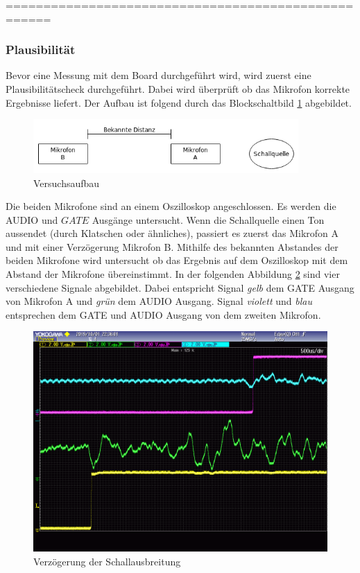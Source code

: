 ====================================================
\subsubsection{Plausibilität}
Bevor eine Messung mit dem Board durchgeführt wird, wird zuerst eine Plausibilitätscheck durchgeführt. Dabei wird überprüft ob das Mikrofon korrekte Ergebnisse liefert. Der Aufbau ist folgend durch das Blockschaltbild \ref{img:blockschaltbild_plausibilitaetscheck} abgebildet. 
\begin{figure}[H]
        \centering
        \includegraphics[width=0.9\textwidth]{images/plausibilitaetscheck.png}
        \caption{Versuchsaufbau}
        \label{img:blockschaltbild_plausibilitaetscheck}
\end{figure}

Die beiden Mikrofone sind an einem Oszilloskop angeschlossen. Es werden die \si{AUDIO} und $GATE$ Ausgänge untersucht. Wenn die Schallquelle einen Ton aussendet (durch Klatschen oder ähnliches), passiert es zuerst das Mikrofon A und mit einer Verzögerung Mikrofon B. Mithilfe des bekannten Abstandes der beiden Mikrofone wird untersucht ob das Ergebnis auf dem Oszilloskop mit dem Abstand der Mikrofone übereinstimmt. In der folgenden Abbildung \ref{img:plausibilitaetscheck_oszi} sind vier verschiedene Signale abgebildet. Dabei entspricht Signal \textit{gelb} dem \si{GATE} Ausgang von Mikrofon A und \textit{grün} dem \si{AUDIO} Ausgang. Signal \textit{violett} und \textit{blau} entsprechen dem \si{GATE} und \si{AUDIO} Ausgang von dem zweiten Mikrofon.

\begin{figure}[H]
        \centering
        \hspace*{-1.9cm}
        \includegraphics[width=1.2\textwidth]{images/plausibilitaetscheck_oszi.png}
        \caption{Verzögerung der Schallausbreitung}
        \label{img:plausibilitaetscheck_oszi}
\end{figure}

